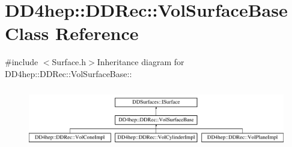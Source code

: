 \hypertarget{class_d_d4hep_1_1_d_d_rec_1_1_vol_surface_base}{
\section{DD4hep::DDRec::VolSurfaceBase Class Reference}
\label{class_d_d4hep_1_1_d_d_rec_1_1_vol_surface_base}
}


{\ttfamily \#include $<$Surface.h$>$}Inheritance diagram for DD4hep::DDRec::VolSurfaceBase::\begin{figure}[H]
\begin{center}
\leavevmode
\includegraphics[height=2.66667cm]{class_d_d4hep_1_1_d_d_rec_1_1_vol_surface_base}
\end{center}
\end{figure}
